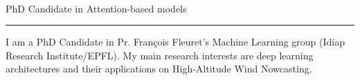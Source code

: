 \documentclass{article}
\let\oldhrule\hrule
\renewcommand{\hrule}{\color{LightGray}\oldhrule\color{black}}
\begin{document}
\begin{minipage}{0.2\textwidth}

\end{minipage}
\begin{minipage}{0.7\textwidth}
  \centering

   \\ \vspace{3mm}
  \sc \montserratthin PhD Candidate in Attention-based models
\end{minipage}

\vspace{4mm}
\hrule
\vspace{4mm}
\color{DeepGray}
I am a PhD Candidate in Pr. François Fleuret's Machine Learning group (Idiap Research Institute/EPFL). My main research interests are deep learning architectures and their applications on High-Altitude Wind Nowcasting. \\
\end{document}
